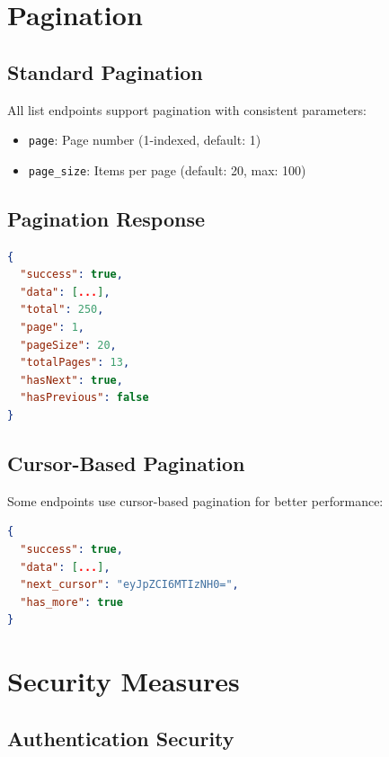 \documentclass[11pt,a4paper]{report}
\begin{document}
\newpage

\chapter{Pagination}

\section{Standard Pagination}

All list endpoints support pagination with consistent parameters:

\begin{itemize}[leftmargin=*]
    \item \texttt{page}: Page number (1-indexed, default: 1)
    \item \texttt{page\_size}: Items per page (default: 20, max: 100)
\end{itemize}

\section{Pagination Response}

\begin{lstlisting}[style=jsoncode,language=json]
{
  "success": true,
  "data": [...],
  "total": 250,
  "page": 1,
  "pageSize": 20,
  "totalPages": 13,
  "hasNext": true,
  "hasPrevious": false
}
\end{lstlisting}

\section{Cursor-Based Pagination}

Some endpoints use cursor-based pagination for better performance:

\begin{lstlisting}[style=jsoncode,language=json]
{
  "success": true,
  "data": [...],
  "next_cursor": "eyJpZCI6MTIzNH0=",
  "has_more": true
}
\end{lstlisting}

\newpage

\chapter{Security Measures}

\section{Authentication Security}
\end{document}

